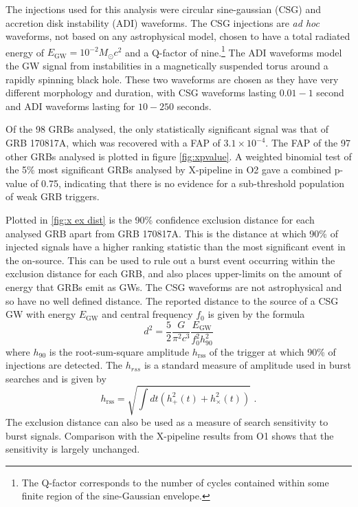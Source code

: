 \documentclass[11pt]{cuthesis}
\newcommand{\fs}{\text{ .}}
\newcommand{\xp}{X-pipeline }
\begin{document}
The injections used for this analysis were circular sine-gaussian (CSG) and accretion disk instability (ADI) waveforms. \cite{vanputten1,vanputten2} The CSG injections are \textit{ad hoc} waveforms, not based on any astrophysical model, chosen to have a total radiated energy of $E_\text{GW} = 10^{-2}M_\odot c^2$ and a Q-factor of nine.\footnote{The Q-factor corresponds to the number of cycles contained within some finite region of the sine-Gaussian envelope.} The ADI waveforms model the GW signal from instabilities in a magnetically suspended torus around a rapidly spinning black hole. These two waveforms are chosen as they have very different morphology and duration, with CSG waveforms lasting $0.01 - 1$ second and ADI waveforms lasting for $10 - 250$ seconds.

Of the 98 GRBs analysed, the only statistically significant signal was that of GRB 170817A, which was recovered with a FAP of $3.1\times 10^{-4}$. The FAP of the 97 other GRBs analysed is plotted in figure \ref{fig:xpvalue}. A weighted binomial test of the 5\% most significant GRBs analysed by \xp in O2 gave a combined p-value of 0.75, indicating that there is no evidence for a sub-threshold population of weak GRB triggers. 

Plotted in \ref{fig:x ex dist} is the 90\% confidence exclusion distance for each analysed GRB apart from GRB 170817A. This is the distance at which 90\% of injected signals have a higher ranking statistic than the most significant event in the on-source. This can be used to rule out a burst event occurring within the exclusion distance for each GRB, and also places upper-limits on the amount of energy that GRBs emit as GWs. The CSG waveforms are not astrophysical and so have no well defined distance. The reported distance to the source of a CSG GW with energy $E_\text{GW}$ and central frequency $f_0$ is given by the formula \cite{Sutton:2013ooa}
\begin{equation}
d^2 = \frac{5}{2}\frac{G}{\pi^2 c^3}\frac{E_\text{GW}}{f_0^2 h_\text{90}^2 }  
\end{equation}
where $h_\text{90}$ is the root-sum-square amplitude $h_\text{rss}$ of the trigger at which 90\% of injections are detected. The $h_{rss}$ is a standard measure of amplitude used in burst searches and is given by
\begin{equation}
h_\text{rss} = \sqrt{\int dt (h_+^2(t) + h_\times^2(t))} \fs
\end{equation}
The exclusion distance can also be used as a measure of search sensitivity to burst signals. Comparison with the \xp results from O1 \cite{o1grb} shows that the sensitivity is largely unchanged. 
\end{document}
